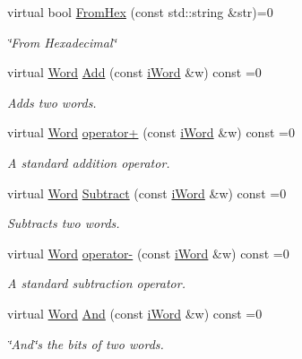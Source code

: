 \begin{DoxyCompactItemize}
virtual bool \hyperlink{classiWord_abd4229c26d0a2ff17b0a6bdb74240388}{FromHex} (const std::string \&str)=0
\begin{DoxyCompactList}\small\item\em \char`\"{}From Hexadecimal\char`\"{} \item\end{DoxyCompactList}\item 
virtual \hyperlink{classWord}{Word} \hyperlink{classiWord_ac5967eac5182607ac41b9ce6c3a74cb8}{Add} (const \hyperlink{classiWord}{iWord} \&w) const =0
\begin{DoxyCompactList}\small\item\em Adds two words. \item\end{DoxyCompactList}\item 
virtual \hyperlink{classWord}{Word} \hyperlink{classiWord_a146bf924df8cbb03fbe8152e5e44edbe}{operator+} (const \hyperlink{classiWord}{iWord} \&w) const =0
\begin{DoxyCompactList}\small\item\em A standard addition operator. \item\end{DoxyCompactList}\item 
virtual \hyperlink{classWord}{Word} \hyperlink{classiWord_a8e2da1fb4c3ffcc78e1d94f1798797ec}{Subtract} (const \hyperlink{classiWord}{iWord} \&w) const =0
\begin{DoxyCompactList}\small\item\em Subtracts two words. \item\end{DoxyCompactList}\item 
virtual \hyperlink{classWord}{Word} \hyperlink{classiWord_a8fbd3f879952196cca2e4f03bac3890b}{operator-\/} (const \hyperlink{classiWord}{iWord} \&w) const =0
\begin{DoxyCompactList}\small\item\em A standard subtraction operator. \item\end{DoxyCompactList}\item 
virtual \hyperlink{classWord}{Word} \hyperlink{classiWord_ad9caea73d7a990bf5189ba1e44ec7865}{And} (const \hyperlink{classiWord}{iWord} \&w) const =0
\begin{DoxyCompactList}\small\item\em \char`\"{}And\char`\"{}s the bits of two words. \item\end{DoxyCompactList}\item 

\end{DoxyCompactItemize}
